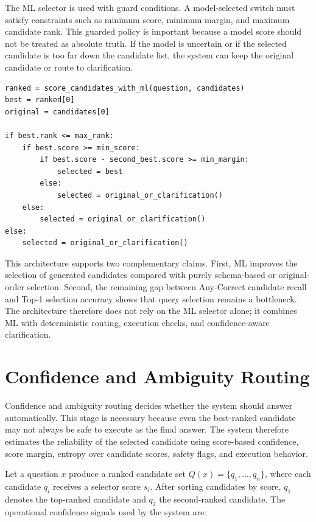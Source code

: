 The ML selector is used with guard conditions. A model-selected switch must satisfy constraints such as minimum score, minimum margin, and maximum candidate rank. This guarded policy is important because a model score should not be treated as absolute truth. If the model is uncertain or if the selected candidate is too far down the candidate list, the system can keep the original candidate or route to clarification.

\begin{lstlisting}[caption={Guarded ML reranking policy.}, label={lst:guarded-ml-policy}]
ranked = score_candidates_with_ml(question, candidates)
best = ranked[0]
original = candidates[0]

if best.rank <= max_rank:
    if best.score >= min_score:
        if best.score - second_best.score >= min_margin:
            selected = best
        else:
            selected = original_or_clarification()
    else:
        selected = original_or_clarification()
else:
    selected = original_or_clarification()
\end{lstlisting}

This architecture supports two complementary claims. First, ML improves the selection of generated candidates compared with purely schema-based or original-order selection. Second, the remaining gap between Any-Correct candidate recall and Top-1 selection accuracy shows that query selection remains a bottleneck. The architecture therefore does not rely on the ML selector alone; it combines ML with deterministic routing, execution checks, and confidence-aware clarification.

\section{Confidence and Ambiguity Routing}
\label{sec:confidence-ambiguity-routing}

Confidence and ambiguity routing decides whether the system should answer automatically. This stage is necessary because even the best-ranked candidate may not always be safe to execute as the final answer. The system therefore estimates the reliability of the selected candidate using score-based confidence, score margin, entropy over candidate scores, safety flags, and execution behavior.

Let a question $x$ produce a ranked candidate set
$Q(x)=\{q_1,\ldots,q_n\}$, where each candidate $q_i$ receives a selector
score $s_i$. After sorting candidates by score, $q_1$ denotes the top-ranked
candidate and $q_2$ the second-ranked candidate. The operational confidence
signals used by the system are:

